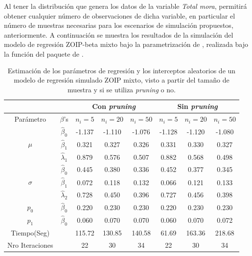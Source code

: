 Al tener la distribuci\'{o}n que genera los datos de la variable \textsl{Total mora}, permitir\'{a} obtener cualquier n\'{u}mero de observaciones de dicha variable, en particular el n\'{u}mero de muestras necesarias para los escenarios de simulaci\'{o}n propuestos, anteriormente. A continuaci\'{o}n se muestra los resultados de la simulaci\'{o}n del modelo de regresi\'{o}n ZOIP-beta mixto bajo la parametrizaci\'{o}n de \cite{Stasinopoulos2}, realizada bajo la funci\'{o}n  del paquete  de .\\

\begin{table}[!hbt]
{\scriptsize
\begin{center}
\begin{tabular}{|c|c|c|c|c|c|c|c|}\hline
& & \multicolumn{3}{|c|}{Con \textit{pruning}} & \multicolumn{3}{|c|}{Sin \textit{pruning}} \\ \hline
Par\'{a}metro & $\beta$'s & $n_i=5$ & $n_i=20$ & $n_i=50$ & $n_i=5$ & $n_i=20$ & $n_i=50$ \\ \hline \hline
\multirow{3}{*}{$\mu$} & $\hat{\beta}_0$ & -1.137	&-1.110	&-1.076	&-1.128	&-1.120	&-1.080 \\ 
& $\hat{\beta}_1$ & 0.321	&0.327	&0.326	&0.331	&0.330	&0.327 \\
& $\hat{\lambda}_1$ & 0.879	&0.576	&0.507	&0.882	&0.568	&0.498 \\ \hline
\multirow{3}{*}{$\sigma$} & $\hat{\beta}_0$ & 0.445	&0.380	&0.336	&0.452	&0.377	&0.345 \\ 
& $\hat{\beta}_1$ & 0.072	&0.118	&0.132	&0.066	&0.121	&0.133\\
& $\hat{\lambda}_2$ & 0.728	&0.450	&0.396	&0.727	&0.456	&0.398\\ \hline
$p_0$& $\hat{\beta}_0$ &0.220	&0.230	&0.230	&0.220	&0.230	&0.230 \\ \hline
$p_1$& $\hat{\beta}_0$ &0.060	&0.070	&0.070	&0.060	&0.070	&0.072 \\ \hline
Tiempo(Seg)& &115.72	&130.85	&140.58	&61.69	&163.36	&218.68 \\ \hline
Nro Iteraciones& &22	&30	&34	&22	&30	&34 \\ \hline
\end{tabular}
\caption{Estimaci\'{o}n de los par\'{a}metros de regresi\'{o}n y los interceptos aleatorios de un modelo de regresi\'{o}n simulado ZOIP mixto, visto a partir del tama\~{n}o de muestra y si se utiliza \textit{pruning} o no.}
\label{T_Sim_mix_ni}
\end{center}
}
\end{table}

